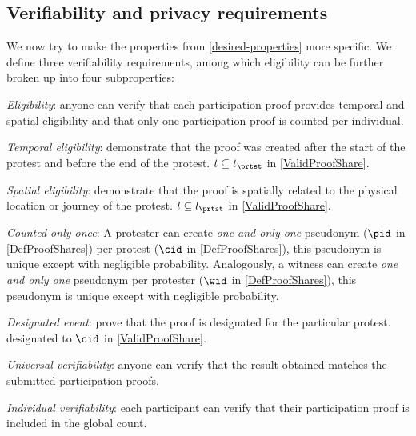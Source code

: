 \subsection{Verifiability and privacy requirements}%
\label{verifiability-properties}

We now try to make the properties from \cref{desired-properties} more 
specific.
We define three verifiability requirements, among which eligibility can be 
further broken up into four subproperties:
\begin{requirements}[V]
  \item\label{EligibilityVerif} \emph{Eligibility}: anyone can verify that each participation proof provides temporal and spatial eligibility and that only one participation proof is counted per individual.
    \begin{requirements}

    \item\label{TemporallyRelated} \emph{Temporal eligibility}: demonstrate that the proof was created after the start of the protest and before the end of the protest.
      \Ie \(t\subseteq t_\prtst\) in \cref{ValidProofShare}.

    \item\label{SpatiallyRelated} \emph{Spatial eligibility}: demonstrate that the proof is spatially related to the physical location or journey of the protest.
      \Ie \(l\subseteq l_\prtst\) in \cref{ValidProofShare}.

    \item\label{CountOnce} \emph{Counted only once}:
      A protester can create \emph{one and only one} pseudonym (\(\pid\) in 
      \cref{DefProofShares}) per protest (\(\cid\) in \cref{DefProofShares}), 
      this pseudonym is unique except with negligible probability.
      Analogously, a witness can create \emph{one and only one} pseudonym per 
      protester (\(\wid\) in \cref{DefProofShares}), this pseudonym is unique 
      except with negligible probability.

    \item\label{DesignatedEvent} \emph{Designated event}: prove that the proof 
      is designated for the particular protest.
      \Ie designated to \(\cid\) in \cref{ValidProofShare}.

    \end{requirements}

  \item\label{UniversalVerif} \emph{Universal verifiability}: anyone can verify that the result obtained matches the submitted participation proofs.

  \item\label{IndividualVerif} \emph{Individual verifiability}: each participant can verify that their participation proof is included in the global count.
\end{requirements}

